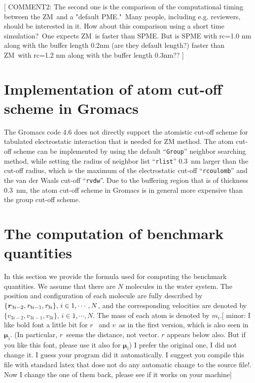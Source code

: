 \documentclass[a4paper,preprint,unsortedaddress,onecolumn,fleqn]{revtex4}
\newcommand{\recheck}[1]{{\color{red} #1}}
\newcommand{\vect}[1]{\textbf{\textit{#1}}}
\begin{document}
[ {\color{blue} COMMENT2: The second one is the comparison of the
computational timing between the ZM\ and a "default PME."\ Many people,
including e.g. reviewers, should be interested in it. How about this
comparison using a short time simulation?\ One expects ZM\ is faster than
SPME. But is SPME with rc=1.0 nm along with the buffer length 0.2nm (are
they default length?) faster than ZM\ with rc=1.2 nm along with the buffer
length 0.3nm?? }]

\appendix

\section{Implementation of atom cut-off scheme in Gromacs}
\label{app:cut-off}

The Gromacs code 4.6 does not directly 
support the atomistic cut-off scheme for tabulated electrostatic interaction that is
needed for ZM method. The atom cut-off scheme can be implemented
by using the default ``\texttt{Group}'' neighbor searching method, while setting
the radius of neighbor list ``\texttt{rlist}'' 0.3~nm larger than the cut-off radius,
which is the maximum of the electrostatic cut-off ``\texttt{rcoulomb}'' and the van der Waals cut-off ``\texttt{rvdw}''.
Due to the buffering region that is of thickness 0.3~nm, the atom cut-off scheme in Gromacs is in general more expensive than the group cut-off scheme.

\section{The computation of benchmark quantities}

\label{appendix:benchmark}

In this section we provide the formula used for computing the benchmark
quantities. We assume that there are $N$ molecules in the water system. The
position and configuration of each molecule are fully described by $\{\vect r_{3i-2},\mathbf{\mathit{r}}_{3i-1},\mathbf{\mathit{r}}
_{3i}\},\,i\in 1,\cdots ,N$, and the corresponding velocities are denoted by 
$\{\mathbf{\mathit{v}}_{3i-2},\mathbf{\mathit{v}}_{3i-1},\mathbf{\mathit{v}}%
_{3i}\},\,i\in 1,\cdots ,N$. The mass of each atom is denoted by $m_{i}$.[ {%
\color{blue} minor: I like bold font a little bit for $\mathbf{\mathit{r}}${%
\ and }$\mathbf{\mathit{v}}${\ as in the first version, which is also seen
in }$\boldsymbol{\mu }_{i}${. (In particular, }$\mathbf{\mathit{r}}${\ seems
the distance, not vector. $\mathbf{\mathit{r}}$ appears below also. But if
you like this font, please use it also for $\boldsymbol{\mu }_{i}$)}} \recheck{I prefer the original one, I did not change it. I guess your program did it automatically. I suggest you compile this file with standard latex that dose not do any automatic change to the source file!. Now I change the one of them back, please see if it works on your machine}]
\end{document}
